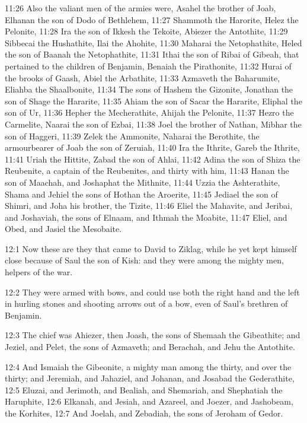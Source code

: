 11:26 Also the valiant men of the armies were, Asahel the brother of
Joab, Elhanan the son of Dodo of Bethlehem, 11:27 Shammoth the
Harorite, Helez the Pelonite, 11:28 Ira the son of Ikkesh the Tekoite,
Abiezer the Antothite, 11:29 Sibbecai the Hushathite, Ilai the
Ahohite, 11:30 Maharai the Netophathite, Heled the son of Baanah the
Netophathite, 11:31 Ithai the son of Ribai of Gibeah, that pertained
to the children of Benjamin, Benaiah the Pirathonite, 11:32 Hurai of
the brooks of Gaash, Abiel the Arbathite, 11:33 Azmaveth the
Baharumite, Eliahba the Shaalbonite, 11:34 The sons of Hashem the
Gizonite, Jonathan the son of Shage the Hararite, 11:35 Ahiam the son
of Sacar the Hararite, Eliphal the son of Ur, 11:36 Hepher the
Mecherathite, Ahijah the Pelonite, 11:37 Hezro the Carmelite, Naarai
the son of Ezbai, 11:38 Joel the brother of Nathan, Mibhar the son of
Haggeri, 11:39 Zelek the Ammonite, Naharai the Berothite, the
armourbearer of Joab the son of Zeruiah, 11:40 Ira the Ithrite, Gareb
the Ithrite, 11:41 Uriah the Hittite, Zabad the son of Ahlai, 11:42
Adina the son of Shiza the Reubenite, a captain of the Reubenites, and
thirty with him, 11:43 Hanan the son of Maachah, and Joshaphat the
Mithnite, 11:44 Uzzia the Ashterathite, Shama and Jehiel the sons of
Hothan the Aroerite, 11:45 Jediael the son of Shimri, and Joha his
brother, the Tizite, 11:46 Eliel the Mahavite, and Jeribai, and
Joshaviah, the sons of Elnaam, and Ithmah the Moabite, 11:47 Eliel,
and Obed, and Jasiel the Mesobaite.

12:1 Now these are they that came to David to Ziklag, while he yet
kept himself close because of Saul the son of Kish: and they were
among the mighty men, helpers of the war.

12:2 They were armed with bows, and could use both the right hand and
the left in hurling stones and shooting arrows out of a bow, even of
Saul's brethren of Benjamin.

12:3 The chief was Ahiezer, then Joash, the sons of Shemaah the
Gibeathite; and Jeziel, and Pelet, the sons of Azmaveth; and Berachah,
and Jehu the Antothite.

12:4 And Ismaiah the Gibeonite, a mighty man among the thirty, and
over the thirty; and Jeremiah, and Jahaziel, and Johanan, and Josabad
the Gederathite, 12:5 Eluzai, and Jerimoth, and Bealiah, and
Shemariah, and Shephatiah the Haruphite, 12:6 Elkanah, and Jesiah, and
Azareel, and Joezer, and Jashobeam, the Korhites, 12:7 And Joelah, and
Zebadiah, the sons of Jeroham of Gedor.

